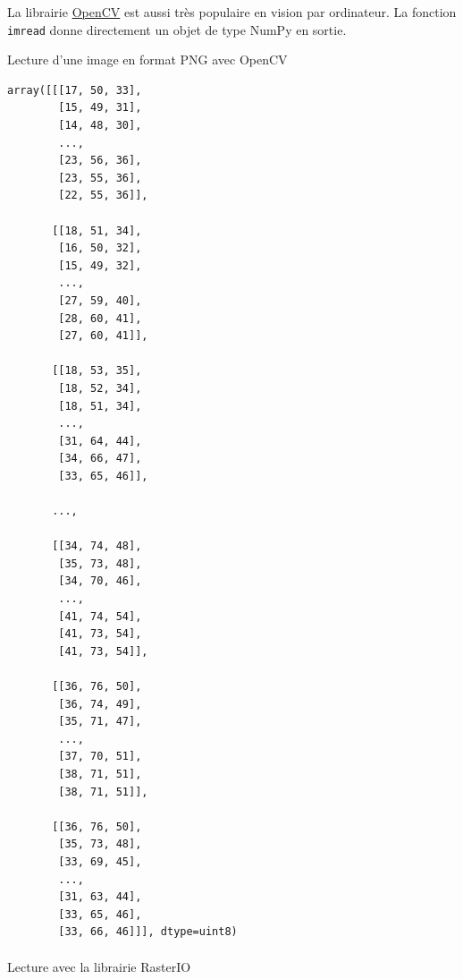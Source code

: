 \documentclass[
  11pt,
  letterpaper,
  open=any,
  twoside=false,
  french]{scrbook}
\makeatletter
\let\oldparagraph\paragraph
\renewcommand{\paragraph}{
    \@ifstar
      \xxxParagraphStar
      \xxxParagraphNoStar
  }
\newcommand{\xxxParagraphStar}[1]{\oldparagraph*{#1}\mbox{}}
\newcommand{\xxxParagraphNoStar}[1]{\oldparagraph{#1}\mbox{}}
\newenvironment{Shaded}{\begin{snugshade}}{\end{snugshade}}
\newcommand{\ImportTok}[1]{\textcolor[rgb]{0.00,0.46,0.62}{#1}}
\newcommand{\NormalTok}[1]{\textcolor[rgb]{0.00,0.23,0.31}{#1}}
\newcommand{\OperatorTok}[1]{\textcolor[rgb]{0.37,0.37,0.37}{#1}}
\newcommand{\StringTok}[1]{\textcolor[rgb]{0.13,0.47,0.30}{#1}}
\makeatother
\begin{document}
La librairie \href{https://docs.opencv.org/4.10.0/index.html}{OpenCV}
est aussi très populaire en vision par ordinateur. La fonction
\texttt{imread} donne directement un objet de type NumPy en sortie.

\begin{codelisting}

\caption{\label{lst-lecture-opencv-PNG}Lecture d'une image en format PNG
avec OpenCV}

\centering{

\begin{Shaded}
\begin{Highlighting}[]
\ImportTok{import}\NormalTok{ cv2}
\NormalTok{img }\OperatorTok{=}\NormalTok{ cv2.imread(}\StringTok{\textquotesingle{}modis{-}aqua.PNG\textquotesingle{}}\NormalTok{)}
\NormalTok{img}
\end{Highlighting}
\end{Shaded}

}

\end{codelisting}%

\begin{verbatim}
array([[[17, 50, 33],
        [15, 49, 31],
        [14, 48, 30],
        ...,
        [23, 56, 36],
        [23, 55, 36],
        [22, 55, 36]],

       [[18, 51, 34],
        [16, 50, 32],
        [15, 49, 32],
        ...,
        [27, 59, 40],
        [28, 60, 41],
        [27, 60, 41]],

       [[18, 53, 35],
        [18, 52, 34],
        [18, 51, 34],
        ...,
        [31, 64, 44],
        [34, 66, 47],
        [33, 65, 46]],

       ...,

       [[34, 74, 48],
        [35, 73, 48],
        [34, 70, 46],
        ...,
        [41, 74, 54],
        [41, 73, 54],
        [41, 73, 54]],

       [[36, 76, 50],
        [36, 74, 49],
        [35, 71, 47],
        ...,
        [37, 70, 51],
        [38, 71, 51],
        [38, 71, 51]],

       [[36, 76, 50],
        [35, 73, 48],
        [33, 69, 45],
        ...,
        [31, 63, 44],
        [33, 65, 46],
        [33, 66, 46]]], dtype=uint8)
\end{verbatim}

\paragraph{Lecture avec la librairie
RasterIO}\label{lecture-avec-la-librairie-rasterio}
\end{document}
